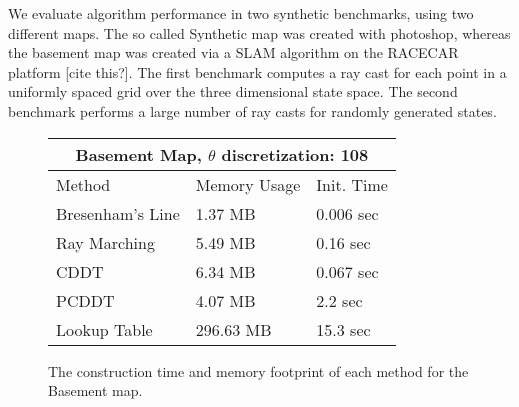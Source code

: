 \documentclass[letterpaper, 10 pt, conference]{ieeeconf}  %
\newcommand{\img}[1]{\begin{center}\texttt{[image: \{\#1]}}\end{center}}
\begin{document}



We evaluate algorithm performance in two synthetic benchmarks, using two different maps. The so called Synthetic map was created with photoshop, whereas the basement map was created via a SLAM algorithm on the RACECAR platform [cite this?]. The first benchmark computes a ray cast for each point in a uniformly spaced grid over the three dimensional state space. The second benchmark performs a large number of ray casts for randomly generated states.

\begin{figure}[ht]
\begin{center}
\begin{tabular}{ | m{8em} | m{2.3cm}| m{1.5cm} | } 
\hline
 \multicolumn{3}{|c|}{Basement Map, $\theta$ discretization: 108} \\
 \hline
 Method & Memory Usage & Init. Time \\
 \hline
 Bresenham's Line & 1.37 MB & 0.006 sec  \\
 Ray Marching & 5.49 MB & 0.16 sec  \\
 CDDT & 6.34 MB & 0.067 sec  \\
 PCDDT & 4.07 MB & 2.2 sec  \\
 Lookup Table & 296.63 MB & 15.3 sec  \\
\hline
\end{tabular}
\end{center}
\caption{The construction time and memory footprint of each method for the Basement map.}
\label{table:basement:init}
\end{figure}
\end{document}

